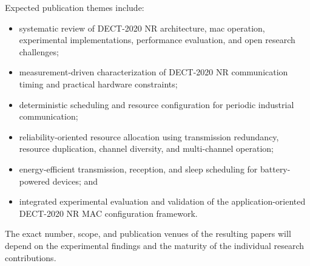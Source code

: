 \documentclass[12pt,a4paper]{article}
\begin{document}
Expected publication themes include:

\begin{itemize}

\item systematic review of DECT-2020 NR architecture, \gls{mac} operation,
experimental implementations, performance evaluation, and open research
challenges;

\item measurement-driven characterization of DECT-2020 NR communication timing
and practical hardware constraints;

\item deterministic scheduling and resource configuration for periodic
industrial communication;

\item reliability-oriented resource allocation using transmission redundancy,
resource duplication, channel diversity, and multi-channel operation;

\item energy-efficient transmission, reception, and sleep scheduling for
battery-powered devices; and

\item integrated experimental evaluation and validation of the
application-oriented DECT-2020 NR MAC configuration framework.

\end{itemize}

The exact number, scope, and publication venues of the resulting papers will
depend on the experimental findings and the maturity of the individual
research contributions.


%

\end{document}
